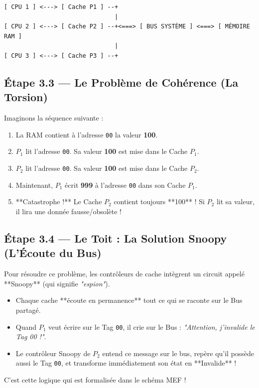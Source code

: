 \documentclass[12pt,a4paper]{article}
\begin{document}
\begin{verbatim}
[ CPU 1 ] <---> [ Cache P1 ] --+
                               |
[ CPU 2 ] <---> [ Cache P2 ] --+<===> [ BUS SYSTÈME ] <===> [ MÉMOIRE RAM ]
                               |
[ CPU 3 ] <---> [ Cache P3 ] --+
\end{verbatim}

\subsection{Étape 3.3 — Le Problème de Cohérence (La Torsion)}
Imaginons la séquence suivante :
\begin{enumerate}
    \item La RAM contient à l'adresse \texttt{00} la valeur \textbf{100}.
    \item $P_1$ lit l'adresse \texttt{00}. Sa valeur \textbf{100} est mise dans le Cache $P_1$.
    \item $P_2$ lit l'adresse \texttt{00}. Sa valeur \textbf{100} est mise dans le Cache $P_2$.
    \item Maintenant, $P_1$ écrit \textbf{999} à l'adresse \texttt{00} dans son Cache $P_1$.
    \item **Catastrophe !** Le Cache $P_2$ contient toujours **100** ! Si $P_2$ lit sa valeur, il lira une donnée fausse/obsolète !
\end{enumerate}

\subsection{Étape 3.4 — Le Toit : La Solution Snoopy (L'Écoute du Bus)}
Pour résoudre ce problème, les contrôleurs de cache intègrent un circuit appelé **Snoopy** (qui signifie \textit{"espion"}). 
\begin{itemize}
    \item Chaque cache **écoute en permanence** tout ce qui se raconte sur le Bus partagé.
    \item Quand $P_1$ veut écrire sur le Tag \texttt{00}, il crie sur le Bus : \textit{"Attention, j'invalide le Tag 00 !"}.
    \item Le contrôleur Snoopy de $P_2$ entend ce message sur le bus, repère qu'il possède aussi le Tag \texttt{00}, et transforme immédiatement son état en **Invalide** !
\end{itemize}

C'est cette logique qui est formalisée dans le schéma MEF !

\newpage
\end{document}
